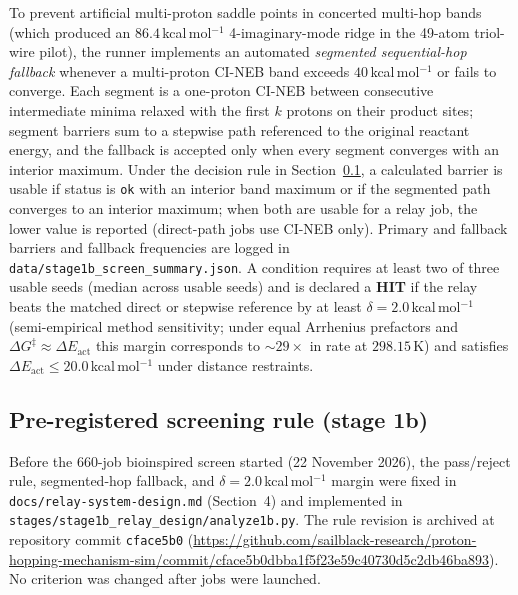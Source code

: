 \documentclass[11pt,a4paper]{article}
\begin{document}
To prevent artificial multi-proton saddle points in concerted multi-hop bands (which produced an $86.4$\,kcal\,mol$^{-1}$ 4-imaginary-mode ridge in the 49-atom triol-wire pilot), the runner implements an automated \textit{segmented sequential-hop fallback} whenever a multi-proton CI-NEB band exceeds $40$\,kcal\,mol$^{-1}$ or fails to converge. Each segment is a one-proton CI-NEB between consecutive intermediate minima relaxed with the first $k$ protons on their product sites; segment barriers sum to a stepwise path referenced to the original reactant energy, and the fallback is accepted only when every segment converges with an interior maximum. Under the decision rule in Section~\ref{sec:prereg}, a calculated barrier is usable if status is \texttt{ok} with an interior band maximum or if the segmented path converges to an interior maximum; when both are usable for a relay job, the lower value is reported (direct-path jobs use CI-NEB only). Primary and fallback barriers and fallback frequencies are logged in \texttt{data/stage1b\_screen\_summary.json}. A condition requires at least two of three usable seeds (median across usable seeds) and is declared a \textbf{HIT} if the relay beats the matched direct or stepwise reference by at least $\delta = 2.0$\,kcal\,mol$^{-1}$ (semi-empirical method sensitivity; under equal Arrhenius prefactors and $\Delta G^\ddagger \approx \Delta E_{\text{act}}$ this margin corresponds to $\sim 29\times$ in rate at $298.15$\,K) and satisfies $\Delta E_{\text{act}} \le 20.0$\,kcal\,mol$^{-1}$ under distance restraints.

\subsection{Pre-registered screening rule (stage 1b)}
\label{sec:prereg}
Before the 660-job bioinspired screen started (22 November 2026), the pass/reject rule, segmented-hop fallback, and $\delta = 2.0$\,kcal\,mol$^{-1}$ margin were fixed in \texttt{docs/relay-system-design.md} (Section~4) and implemented in \texttt{stages/stage1b\_relay\_design/analyze1b.py}. The rule revision is archived at repository commit \texttt{cface5b0} (\url{https://github.com/sailblack-research/proton-hopping-mechanism-sim/commit/cface5b0dbba1f5f23e59c40730d5c2db46ba893}). No criterion was changed after jobs were launched.
\end{document}
